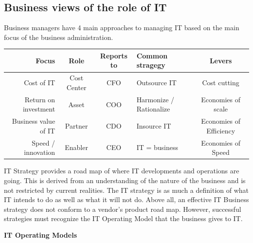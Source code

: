 \documentclass[]{book}
\begin{document}
\hypertarget{business-views-of-the-role-of-it}{%
\subsection{Business views of the role of IT}\label{business-views-of-the-role-of-it}}

Business managers have 4 main approaches to managing IT based on the main focus of the business administration.

\begin{longtable}[]{@{}rcclc@{}}
\toprule
\textbf{Focus} & \textbf{Role} & \textbf{Reports to} & \textbf{Common stragegy} & \textbf{Levers}\tabularnewline
\midrule
\endhead
Cost of IT & Cost Center & CFO & Outsource IT & Cost cutting\tabularnewline
Return on investment & Asset & COO & Harmonize / Rationalize & Economies of scale\tabularnewline
Business value of IT & Partner & CDO & Insource IT & Economies of Efficiency\tabularnewline
Speed / innovation & Enabler & CEO & IT = business & Economies of Speed\tabularnewline
\bottomrule
\end{longtable}

IT Strategy provides a road map of where IT developments and operations are going. This is derived from an understanding of the nature of the business and is not restricted by current realities. The IT strategy is as much a definition of what IT intends to do as well as what it will not do. Above all, an effective IT Business strategy does not conform to a vendor's product road map. However, successful strategies must recognize the IT Operating Model that the business gives to IT. \citep{Ross2006}

\textbf{IT Operating Models}
\end{document}
